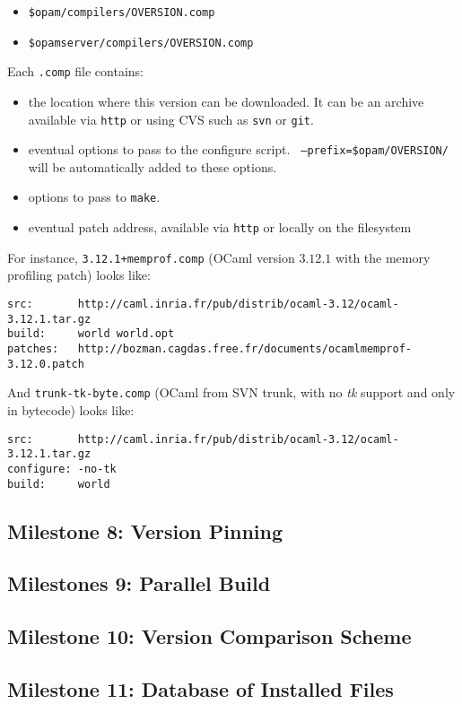 \documentclass[a4paper,11pt]{article}
\begin{document}
\begin{itemize}
\item {\tt \$opam/compilers/OVERSION.comp}
\item {\tt \$opamserver/compilers/OVERSION.comp}
\end{itemize}

Each {\tt .comp} file contains:

\begin{itemize}

\item the location where this version can be downloaded. It can be an
  archive available via {\tt http} or using CVS such as {\tt svn} or
  {\tt git}.

\item eventual options to pass to the configure script. {\tt
  --prefix=\$opam/OVERSION/} will be automatically added to these
  options.

\item options to pass to {\tt make}.

\item eventual patch address, available via {\tt http} or locally on
  the filesystem

\end{itemize}

For instance, {\tt 3.12.1+memprof.comp} (OCaml version $3.12.1$ with
the memory profiling patch) looks like:

\begin{verbatim}
src:       http://caml.inria.fr/pub/distrib/ocaml-3.12/ocaml-3.12.1.tar.gz
build:     world world.opt
patches:   http://bozman.cagdas.free.fr/documents/ocamlmemprof-3.12.0.patch
\end{verbatim}

And {\tt trunk-tk-byte.comp} (OCaml from SVN trunk, with no {\em tk}
support and only in bytecode) looks like:

\begin{verbatim}
src:       http://caml.inria.fr/pub/distrib/ocaml-3.12/ocaml-3.12.1.tar.gz
configure: -no-tk
build:     world
\end{verbatim}

\subsection{Milestone 8: Version Pinning}

\subsection{Milestones 9: Parallel Build}

\subsection{Milestone 10: Version Comparison Scheme}

\subsection{Milestone 11: Database of Installed Files}
\end{document}
